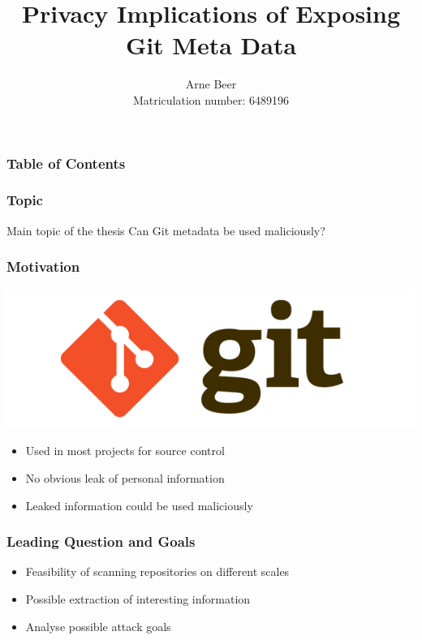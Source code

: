 \documentclass[t]{beamer}
\title[Privacy Implications of Exposing Git Metadata]
{Privacy Implications of Exposing Git Meta Data}
\author[Beer]{Arne Beer \\ \footnotesize Matriculation number: 6489196}
\begin{document}
\begin{frame}[plain]
    \maketitle
\end{frame}

\begin{frame}
    \frametitle{Table of Contents}
	\tableofcontents
\end{frame}

\begin{frame}
    \frametitle{Topic}
    \begin{center}
        \vspace{1cm}
        \begin{block}{Main topic of the thesis}
            Can Git metadata be used maliciously?
        \end{block}
    \end{center}
\end{frame}

\begin{frame}
    \frametitle{Motivation}
    \vspace{5mm}
    \begin{center}
        \includegraphics[scale=0.15]{./pic/git-logo.png}
    \end{center}
    \begin{itemize}
        \item Used in most projects for source control
        \pause{}
        \item No obvious leak of personal information
        \pause{}
        \item Leaked information could be used maliciously
    \end{itemize}
\end{frame}

\begin{frame}
    \frametitle{Leading Question and Goals}
    \begin{itemize}
        \item Feasibility of scanning repositories on different scales
        \item Possible extraction of interesting information
        \item Analyse possible attack goals
    \end{itemize}
\end{frame}
\end{document}
